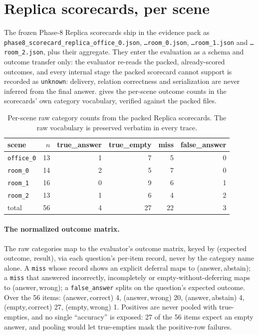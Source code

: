 \section{Replica scorecards, per scene}
\label{ssec:replica}

The frozen Phase-8 Replica scorecards ship in the evidence pack as
\texttt{phase8\_scorecard\_replica\_office\_0.json},
\texttt{\ldots room\_0.json}, \texttt{\ldots room\_1.json} and
\texttt{\ldots room\_2.json}, plus their aggregate. They enter the
evaluation as a schema and outcome transfer only: the evaluator re-reads the
packed, already-scored outcomes, and every internal stage the packed
scorecard cannot support is recorded as \texttt{unknown}: delivery,
relation correctness and serialization are never inferred from the final
answer.  gives the per-scene outcome counts in the
scorecards' own category vocabulary, verified against the packed files.

\begin{table}[t]
  \centering\footnotesize
  \setlength{\tabcolsep}{4pt}
  \begin{tabular}{@{}lrrrrr@{}}
    \toprule
    scene & $n$ & true\_answer & true\_empty & miss & false\_answer\\
    \midrule
    \texttt{office\_0} & 13 & 1 & 7 & 5 & 0\\
    \texttt{room\_0}   & 14 & 2 & 5 & 7 & 0\\
    \texttt{room\_1}   & 16 & 0 & 9 & 6 & 1\\
    \texttt{room\_2}   & 13 & 1 & 6 & 4 & 2\\
    \midrule
    total              & 56 & 4 & 27 & 22 & 3\\
    \bottomrule
  \end{tabular}
  \caption{Per-scene raw category counts from the packed Replica
  scorecards. The raw vocabulary is preserved verbatim in every trace.}
  \label{tab:replica}
\end{table}

\paragraph{The normalized outcome matrix.} The raw categories map to the
evaluator's outcome matrix, keyed by (expected outcome, result), via each
question's per-item record, never by the category name alone. A
\texttt{miss} whose record shows an explicit deferral maps to
(answer,\,abstain); a \texttt{miss} that answered incorrectly, incompletely
or empty-without-deferring maps to (answer,\,wrong); a
\texttt{false\_answer} splits on the question's expected outcome. Over the
56 items: (answer,\,correct) 4, (answer,\,wrong) 20, (answer,\,abstain) 4,
(empty,\,correct) 27, (empty,\,wrong) 1. Positives are never pooled with
true-empties, and no single ``accuracy'' is exposed: 27 of the 56 items
expect an empty answer, and pooling would let true-empties mask the
positive-row failures.

